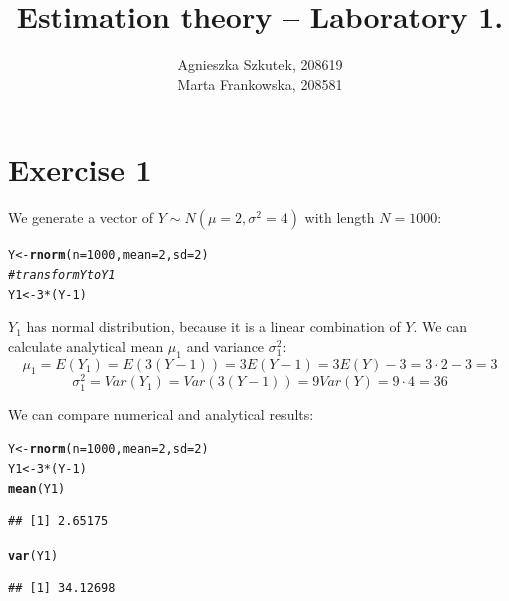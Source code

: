 \documentclass[12pt, a4paper]{article}\usepackage[]{graphicx}\usepackage[]{color}
\makeatletter
\newcommand{\hlnum}[1]{\textcolor[rgb]{0.686,0.059,0.569}{#1}}%
\newcommand{\hlcom}[1]{\textcolor[rgb]{0.678,0.584,0.686}{\textit{#1}}}%
\newcommand{\hlopt}[1]{\textcolor[rgb]{0,0,0}{#1}}%
\newcommand{\hlstd}[1]{\textcolor[rgb]{0.345,0.345,0.345}{#1}}%
\newcommand{\hlkwb}[1]{\textcolor[rgb]{0.69,0.353,0.396}{#1}}%
\newcommand{\hlkwc}[1]{\textcolor[rgb]{0.333,0.667,0.333}{#1}}%
\newcommand{\hlkwd}[1]{\textcolor[rgb]{0.737,0.353,0.396}{\textbf{#1}}}%
\newenvironment{kframe}{%
 \def\at@end@of@kframe{}%
 \ifinner\ifhmode%
  \def\at@end@of@kframe{\end{minipage}}%
  \begin{minipage}{\columnwidth}%
 \fi\fi%
 \def\FrameCommand##1{\hskip\@totalleftmargin \hskip-\fboxsep
 \colorbox{shadecolor}{##1}\hskip-\fboxsep
     \hskip-\linewidth \hskip-\@totalleftmargin \hskip\columnwidth}%
 \MakeFramed {\advance\hsize-\width
   \@totalleftmargin\z@ \linewidth\hsize
   \@setminipage}}%
 {\par\unskip\endMakeFramed%
 \at@end@of@kframe}
\newenvironment{knitrout}{}{} %
\makeatother
\begin{document}
\title{Estimation theory -- Laboratory 1.}
\author{Agnieszka Szkutek, 208619 \\ Marta Frankowska, 208581}
\maketitle
\tableofcontents 


\section{Exercise 1}

We generate a vector of $Y\sim N(\mu=2, \sigma^2=4)$ with length $N = 1000$:
\begin{knitrout}
\color{fgcolor}\begin{kframe}
\begin{alltt}
\hlstd{Y} \hlkwb{<-} \hlkwd{rnorm}\hlstd{(}\hlkwc{n} \hlstd{=} \hlnum{1000}\hlstd{,} \hlkwc{mean} \hlstd{=} \hlnum{2}\hlstd{,} \hlkwc{sd} \hlstd{=} \hlnum{2}\hlstd{)}
\hlcom{# transform Y to Y1}
\hlstd{Y1} \hlkwb{<-} \hlnum{3} \hlopt{*} \hlstd{(Y} \hlopt{-} \hlnum{1}\hlstd{)}
\end{alltt}
\end{kframe}
\end{knitrout}
$Y_1$ has normal distribution, because it is a linear combination of $Y$. We can calculate analytical mean $\mu_1$ and variance $\sigma^2_1$:
\[ \mu_1 = E(Y_1) = E(3 (Y-1)) = 3 E(Y - 1) = 3 E(Y) - 3 = 3 \cdot 2 - 3 = 3\]
\[ \sigma^2_1 = Var(Y_1) = Var(3 (Y-1)) = 9 Var(Y) = 9 \cdot 4 = 36 \]

We can compare numerical and analytical results:
\begin{knitrout}
\color{fgcolor}\begin{kframe}
\begin{alltt}
\hlstd{Y} \hlkwb{<-} \hlkwd{rnorm}\hlstd{(}\hlkwc{n} \hlstd{=} \hlnum{1000}\hlstd{,} \hlkwc{mean} \hlstd{=} \hlnum{2}\hlstd{,} \hlkwc{sd} \hlstd{=} \hlnum{2}\hlstd{)}
\hlstd{Y1} \hlkwb{<-} \hlnum{3} \hlopt{*} \hlstd{(Y} \hlopt{-} \hlnum{1}\hlstd{)}
\hlkwd{mean}\hlstd{(Y1)}
\end{alltt}
\begin{verbatim}
## [1] 2.65175
\end{verbatim}
\begin{alltt}
\hlkwd{var}\hlstd{(Y1)}
\end{alltt}
\begin{verbatim}
## [1] 34.12698
\end{verbatim}
\end{kframe}
\end{knitrout}
\end{document}
